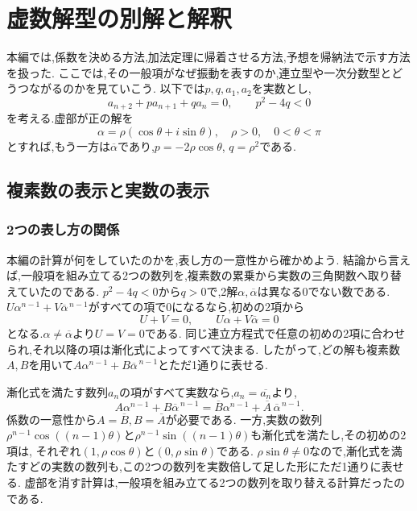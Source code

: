 \section{虚数解型の別解と解釈}\label{節：虚数解型の別解と解釈}

本編では,係数を決める方法,加法定理に帰着させる方法,予想を帰納法で示す方法を扱った.
ここでは,その一般項がなぜ振動を表すのか,連立型や一次分数型とどうつながるのかを見ていこう.
以下では$p,q,a_1,a_2$を実数とし,
\[
  a_{n+2}+pa_{n+1}+qa_n=0,\qquad p^2-4q<0
\]
を考える.虚部が正の解を
\[
  \alpha=\rho(\cos\theta+i\sin\theta),
  \quad \rho>0,\quad 0<\theta<\pi
\]
とすれば,もう一方は$\overline\alpha$であり,$p=-2\rho\cos\theta$, $q=\rho^2$である.

\subsection{複素数の表示と実数の表示}
\subsubsection{2つの表し方の関係}\label{解釈：2つの表し方の関係}
本編の計算が何をしていたのかを,表し方の一意性から確かめよう.
結論から言えば,一般項を組み立てる2つの数列を,複素数の累乗から実数の三角関数へ取り替えていたのである.
$p^2-4q<0$から$q>0$で,2解$\alpha,\overline\alpha$は異なる0でない数である.
$U\alpha^{n-1}+V\overline\alpha^{\,n-1}$がすべての項で0になるなら,初めの2項から
\[
  U+V=0,\qquad U\alpha+V\overline\alpha=0
\]
となる.$\alpha\ne\overline\alpha$より$U=V=0$である.
同じ連立方程式で任意の初めの2項に合わせられ,それ以降の項は漸化式によってすべて決まる.
したがって,どの解も複素数$A,B$を用いて$A\alpha^{n-1}+B\overline\alpha^{\,n-1}$とただ1通りに表せる.

漸化式を満たす数列$a_n$の項がすべて実数なら,$a_n=\overline{a_n}$より,
\[
  A\alpha^{n-1}+B\overline\alpha^{\,n-1}
  =\overline B\alpha^{n-1}+\overline A\,\overline\alpha^{\,n-1}.
\]
係数の一意性から$A=\overline B,B=\overline A$が必要である.
一方,実数の数列$\rho^{n-1}\cos((n-1)\theta)$と$\rho^{n-1}\sin((n-1)\theta)$も漸化式を満たし,その初めの2項は,
それぞれ$(1,\rho\cos\theta)$と$(0,\rho\sin\theta)$である.
$\rho\sin\theta\ne0$なので,漸化式を満たすどの実数の数列も,この2つの数列を実数倍して足した形にただ1通りに表せる.
虚部を消す計算は,一般項を組み立てる2つの数列を取り替える計算だったのである.

